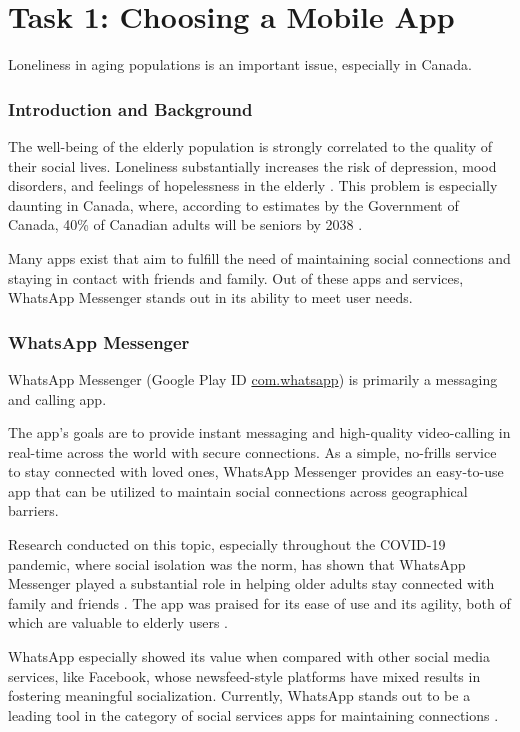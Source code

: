 \part*{Task 1: Choosing a Mobile App}

Loneliness in aging populations is an important issue, especially in Canada.

\section*{Introduction and Background}

The well-being of the elderly population is strongly correlated to the quality
    of their social lives.
Loneliness substantially increases the risk of depression, mood disorders, and
    feelings of hopelessness in the elderly \cite{golden}.
This problem is especially daunting in Canada, where, according to estimates by
    the Government of Canada, 40\% of Canadian adults will be seniors by 2038
    \cite{canada}.

Many apps exist that aim to fulfill the need of maintaining social connections
    and staying in contact with friends and family.
Out of these apps and services, WhatsApp Messenger stands out in its ability to
    meet user needs.

\section*{WhatsApp Messenger}

WhatsApp Messenger
    (Google Play ID \href{https://play.google.com/store/apps/details?id=com.whatsapp\&hl=en}{com.whatsapp})
    is primarily a messaging and calling app.

The app's goals are to provide instant messaging and high-quality video-calling
    in real-time across the world with secure connections.
As a simple, no-frills service to stay connected with loved ones, WhatsApp
    Messenger provides an easy-to-use app that can be utilized to maintain
    social connections across geographical barriers.

Research conducted on this topic, especially throughout the COVID-19 pandemic,
    where social isolation was the norm, has shown that WhatsApp Messenger
    played a substantial role in helping older adults stay connected with family
    and friends \cite{llorente}.
The app was praised for its ease of use and its agility, both of which are
    valuable to elderly users \cite{llorente}.

WhatsApp especially showed its value when compared with other social media
    services, like Facebook, whose newsfeed-style platforms have mixed results
    in fostering meaningful socialization.
Currently, WhatsApp stands out to be a leading tool in the category of social
    services apps for maintaining connections \cite{longjing}.
